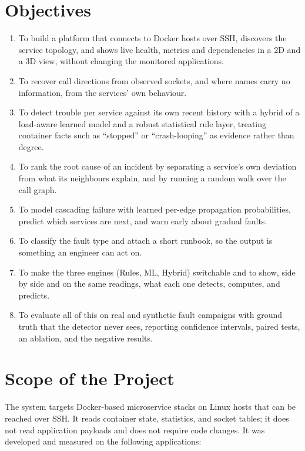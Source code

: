 \section{Objectives}
\begin{enumerate}[label=\arabic*.]
\item To build a platform that connects to Docker hosts over SSH, discovers the service topology, and shows live health, metrics and dependencies in a 2D and a 3D view, without changing the monitored applications.
\item To recover call directions from observed sockets, and where names carry no information, from the services' own behaviour.
\item To detect trouble per service against its own recent history with a hybrid of a load-aware learned model and a robust statistical rule layer, treating container facts such as ``stopped'' or ``crash-looping'' as evidence rather than degree.
\item To rank the root cause of an incident by separating a service's own deviation from what its neighbours explain, and by running a random walk over the call graph.
\item To model cascading failure with learned per-edge propagation probabilities, predict which services are next, and warn early about gradual faults.
\item To classify the fault type and attach a short runbook, so the output is something an engineer can act on.
\item To make the three engines (Rules, ML, Hybrid) switchable and to show, side by side and on the same readings, what each one detects, computes, and predicts.
\item To evaluate all of this on real and synthetic fault campaigns with ground truth that the detector never sees, reporting confidence intervals, paired tests, an ablation, and the negative results.
\end{enumerate}

\section{Scope of the Project}
The system targets Docker-based microservice stacks on Linux hosts that can be reached over SSH. It reads container state, statistics, and socket tables; it does not read application payloads and does not require code changes. It was developed and measured on the following applications:

